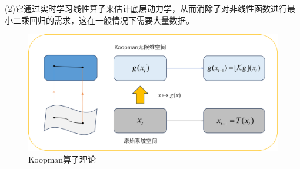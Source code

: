 \documentclass[lang=chs, degree=master, blindreview=false, winfonts=true]{yanputhesis}
\begin{document}
(2)它通过实时学习线性算子来估计底层动力学，从而消除了对非线性函数进行最小二乘回归的需求，这在一般情况下需要大量数据。
\begin{figure}[hbt!]
	\centering
	\includegraphics[width=34pc]{picture/3_1.png} 
	\caption{Koopman算子理论} \label{3_1}
\end{figure}



\end{document}
